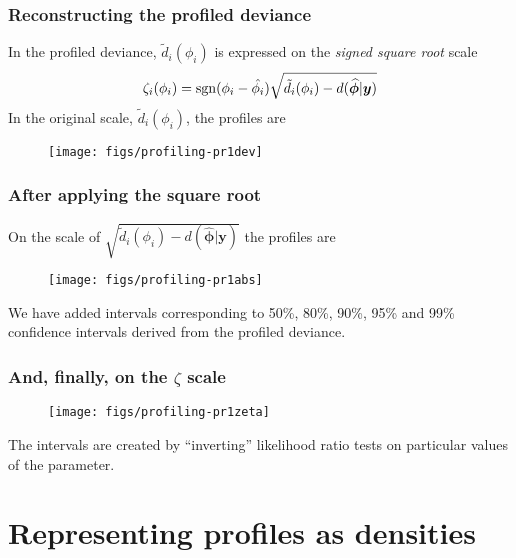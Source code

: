 \documentclass[dvipsnames,pdflatex,beamer]{beamer}
\begin{document}
\begin{frame}
  \frametitle{Reconstructing the profiled deviance}
  In  the profiled deviance, $\tilde{d}_i(\phi_i)$ is
  expressed on the \emph{signed square root} scale
  \begin{displaymath}
    \zeta_i(\phi_i)=\operatorname*{sgn}(\phi_i-\hat{\phi_i})\sqrt{\tilde{d}_i(\phi_i)-d(\widehat{\bm\phi}|\bm y)}
  \end{displaymath}
  In the original scale, $\tilde{d}_i(\phi_i)$, the profiles are
  \begin{figure}[tb]
    \centering
\texttt{[image: figs/profiling-pr1dev]}
  \end{figure}
\end{frame}

\begin{frame}
  \frametitle{After applying the square root}
On the scale of $\sqrt{\tilde{d}_i(\phi_i)-d(\widehat{\bm\phi}|\bm y)}$ the profiles are
  \begin{figure}[tb]
    \centering
\texttt{[image: figs/profiling-pr1abs]}
  \end{figure}
  We have added intervals corresponding to 50\%, 80\%, 90\%,
  95\% and 99\% confidence intervals derived from the profiled
  deviance.
\end{frame}

\begin{frame}
  \frametitle{And, finally, on the $\zeta$ scale}
  \begin{figure}[tb]
    \centering
\texttt{[image: figs/profiling-pr1zeta]}
  \end{figure}
  The intervals are created by ``inverting'' likelihood ratio tests on
  particular values of the parameter.
\end{frame}

\section{Representing profiles as densities}
\end{document}
